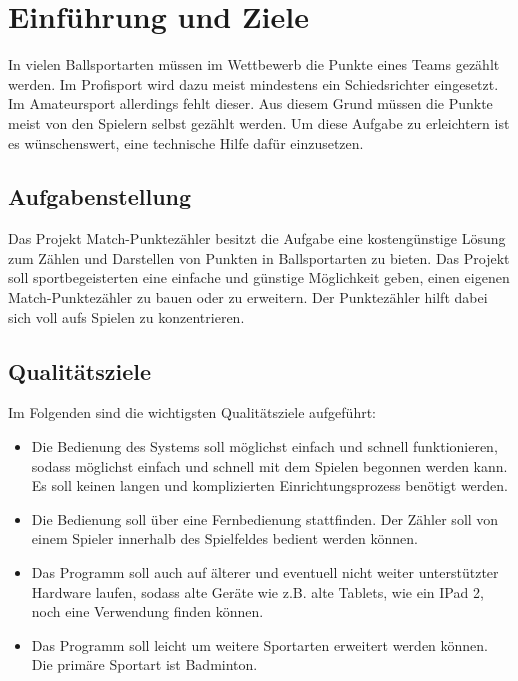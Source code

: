 \chapter{Einführung und Ziele}
In vielen Ballsportarten müssen im Wettbewerb die Punkte eines Teams gezählt werden. Im Profisport wird dazu meist mindestens ein Schiedsrichter eingesetzt. Im Amateursport allerdings fehlt dieser. Aus diesem Grund müssen die Punkte meist von den Spielern selbst gezählt werden. Um diese Aufgabe zu erleichtern ist es wünschenswert, eine technische Hilfe dafür einzusetzen. 
\section{Aufgabenstellung}
Das Projekt Match-Punktezähler besitzt die Aufgabe eine kostengünstige Lösung zum Zählen und Darstellen von Punkten in Ballsportarten zu bieten. Das Projekt soll sportbegeisterten eine einfache und günstige Möglichkeit geben, einen eigenen Match-Punktezähler zu bauen oder zu erweitern. Der Punktezähler hilft dabei sich voll aufs Spielen zu konzentrieren.  
\section{Qualitätsziele}
Im Folgenden sind die wichtigsten Qualitätsziele aufgeführt:\\
\begin{itemize}
	\item Die Bedienung des Systems soll möglichst einfach und schnell funktionieren, sodass möglichst einfach und schnell mit dem Spielen begonnen werden kann. Es soll keinen langen und komplizierten Einrichtungsprozess benötigt werden. 
	\item Die Bedienung soll über eine Fernbedienung stattfinden. Der Zähler soll von einem Spieler innerhalb des Spielfeldes bedient werden können. 
	\item Das Programm soll auch auf älterer und eventuell nicht weiter unterstützter Hardware laufen, sodass alte Geräte wie z.B. alte Tablets, wie ein IPad 2, noch eine Verwendung finden können.
	\item Das Programm soll leicht um weitere Sportarten erweitert werden können. Die primäre Sportart ist Badminton. 
\end{itemize}
